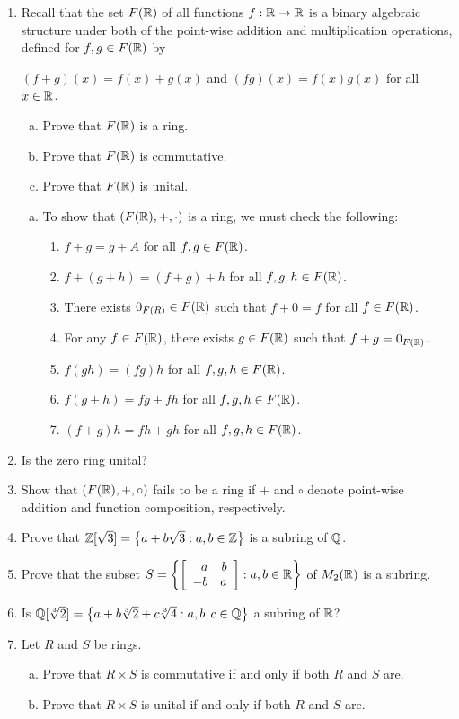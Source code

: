 \documentclass[11pt,fleqn,dvipsnames,usenames]{article}
\begin{document}
\begin{enumerate}[1.]
\item Recall that the set $F(\R)$ of all functions $f:\R\to\R$ is a binary algebraic structure under both of the point-wise addition and multiplication operations, defined for $f,g\in F(\R)$ by
\begin{center}
$(f+g)(x) = f(x) + g(x)$ and $(fg)(x) = f(x)g(x)$ for all $x\in \R$.
\end{center}
\begin{enumerate}[(a)]
\item Prove that $F(\R)$ is a ring.
\item Prove that $F(\R)$ is commutative.
\item Prove that $F(\R)$ is unital.
\end{enumerate}
\vsmsp

\solution

\begin{enumerate}[(a)]
\item To show that $(F(\R), +, \cdot)$ is a ring, we must check the following:
\begin{enumerate}[(1)]
\item $f + g  = g + A$ for all $f,g\in F(\R)$.
\item $f + (g + h) = (f + g) + h$ for all $f,g,h \in F(\R)$.
\item There exists $0_{F(R)}\in F(\R)$ such that $f + 0 = f$ for all $f\in F(\R)$.
\item For any $f\in F(\R)$, there exists $g\in F(\R)$ such that $f + g = 0_{F(\R)}$.
\item $f(gh) = (fg)h$ for all $f,g,h \in F(\R)$.
\item $f(g+h) = fg + fh$ for all $f,g,h \in F(\R)$.
\item $(f+g)h = fh + gh$ for all $f,g,h \in F(\R)$.
\end{enumerate}


\end{enumerate}

\item Is the zero ring unital?

\item Show that $(F(\R),+,\circ)$ fails to be a ring if $+$ and $\circ$ denote point-wise addition and function composition, respectively.
\item Prove that $\Z[\sqrt{3}] = \SET{a + b\sqrt{3}:a,b\in\Z}$ is a subring of $\Q$.
\item Prove that the subset $S = \SET{\MATRIX{rr}{a & b\\-b & a}:a,b\in \R}$ of $M_{2}(\R)$ is a subring.
\item Is $\Q[\sqrt[3]{2}] = \SET{a + b\sqrt[3]{2} + c\sqrt[3]{4}:a,b,c\in\Q}$ a subring of $\R$?
\item Let $R$ and $S$ be rings.
\begin{enumerate}[(a)]
\item Prove that $R\times S$ is commutative if and only if both $R$ and $S$ are.
\item Prove that $R\times S$ is unital if and only if both $R$ and $S$ are.
\end{enumerate}
\end{enumerate}
\vsp
\end{document}
